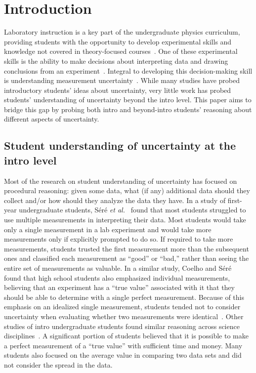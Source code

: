 \documentclass[english,aps,prstper,reprint,showpacs,longbibliography,superscriptaddress,nofootinbib]{revtex4-2}
\begin{document}
\section{Introduction}

Laboratory instruction is a key part of the undergraduate physics curriculum, providing students with the opportunity to develop experimental skills and knowledge not covered in theory-focused courses~\cite{Kozminski2014}. One of these experimental skills is the ability to make decisions about interpreting data and drawing conclusions from an experiment~\cite{Walsh2019,Holmes2019,Holmes2015a,Holmes2015}. Integral to developing this decision-making skill is understanding measurement uncertainty~\cite{Allie2003,Kung2005,Buffler2008}. While many studies have probed introductory students' ideas about uncertainty, very little work has probed students' understanding of uncertainty beyond the intro level. This paper aims to bridge this gap by probing both intro and beyond-intro students' reasoning about different aspects of uncertainty.

\subsection{Student understanding of uncertainty at the intro level}

Most of the research on student understanding of uncertainty has focused on procedural reasoning: given some data, what (if any) additional data should they collect and/or how should they analyze the data they have. In a study of first-year undergraduate students, S\'{e}r\'{e} \textit{et al.}~\cite{Sere1993} found that most students struggled to use multiple measurements in interpreting their data. Most students would take only a single measurement in a lab experiment and would take more measurements only if explicitly prompted to do so. If required to take more measurements, students trusted the first measurement more than the subsequent ones and classified each measurement as ``good'' or ``bad,'' rather than seeing the entire set of measurements as valuable. In a similar study, Coelho and S\'{e}r\'{e}~\cite{Coelho1998} found that high school students also emphasized individual measurements, believing that an experiment has a ``true value'' associated with it that they should be able to determine with a single perfect measurement. Because of this emphasis on an idealized single measurement, students tended not to consider uncertainty when evaluating whether two measurements were identical~\cite{Sere1993,Coelho1998}. Other studies of intro undergraduate students found similar reasoning across science disciplines~\cite{Leach1998,Evangelinos1999}. A significant portion of students believed that it is possible to make a perfect measurement of a ``true value'' with sufficient time and money. Many students also focused on the average value in comparing two data sets and did not consider the spread in the data.
\end{document}
